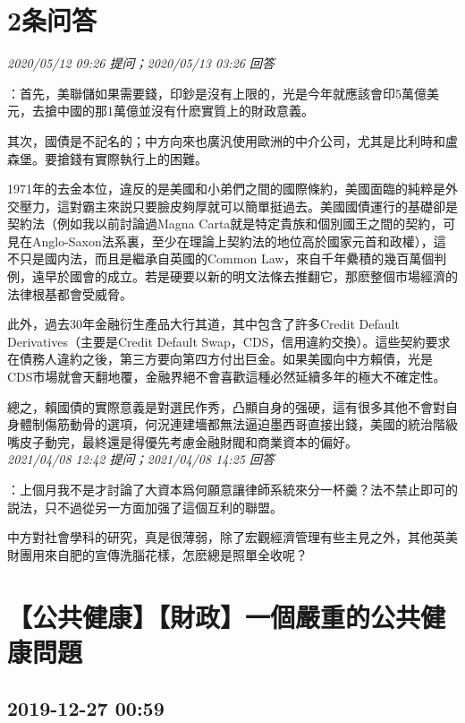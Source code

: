 \documentclass[twocolumn]{ctexart}
\begin{document}
\section{2条问答}

\textit{\hfill\noindent\small 2020/05/12 09:26 提问；2020/05/13 03:26 回答}

：首先，美聯儲如果需要錢，印鈔是沒有上限的，光是今年就應該會印5萬億美元，去搶中國的那1萬億並沒有什麽實質上的財政意義。

其次，國債是不記名的；中方向來也廣汎使用歐洲的中介公司，尤其是比利時和盧森堡。要搶錢有實際執行上的困難。

1971年的去金本位，違反的是美國和小弟們之間的國際條約，美國面臨的純粹是外交壓力，這對霸主來説只要臉皮夠厚就可以簡單挺過去。美國國債運行的基礎卻是契約法（例如我以前討論過Magna Carta就是特定貴族和個別國王之間的契約，可見在Anglo-Saxon法系裏，至少在理論上契約法的地位高於國家元首和政權），這不只是國内法，而且是繼承自英國的Common Law，來自千年纍積的幾百萬個判例，遠早於國會的成立。若是硬要以新的明文法條去推翻它，那麽整個市場經濟的法律根基都會受威脅。

此外，過去30年金融衍生產品大行其道，其中包含了許多Credit Default Derivatives（主要是Credit Default Swap，CDS，信用違約交換）。這些契約要求在債務人違約之後，第三方要向第四方付出巨金。如果美國向中方賴債，光是CDS市場就會天翻地覆，金融界絕不會喜歡這種必然延續多年的極大不確定性。

總之，賴國債的實際意義是對選民作秀，凸顯自身的强硬，這有很多其他不會對自身體制傷筋動骨的選項，何況連建墻都無法逼迫墨西哥直接出錢，美國的統治階級嘴皮子動完，最終還是得優先考慮金融財閥和商業資本的偏好。
\\

\textit{\hfill\noindent\small 2021/04/08 12:42 提问；2021/04/08 14:25 回答}

：上個月我不是才討論了大資本爲何願意讓律師系統來分一杯羹？法不禁止即可的説法，只不過從另一方面加强了這個互利的聯盟。

中方對社會學科的研究，真是很薄弱，除了宏觀經濟管理有些主見之外，其他英美財團用來自肥的宣傳洗腦花樣，怎麽總是照單全收呢？
\\


\section{【公共健康】【財政】一個嚴重的公共健康問題}
\subsection{2019-12-27 00:59}
\end{document}
